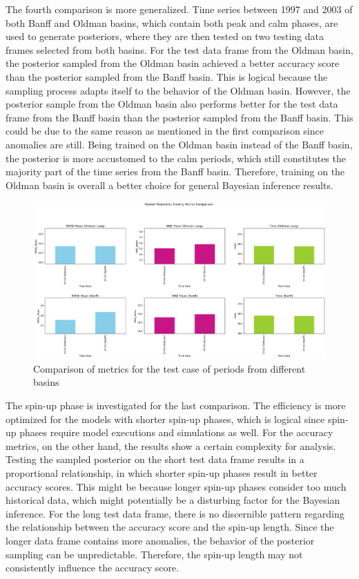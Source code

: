 The fourth comparison is more generalized. Time series between 1997 and 2003 of both Banff and Oldman basins, which contain both peak and calm phases, are used to generate posteriors, where they are then tested on two testing data frames selected from both basins. For the test data frame from the Oldman basin, the posterior sampled from the Oldman basin achieved a better accuracy score than the posterior sampled from the Banff basin. This is logical because the sampling process adapts itself to the behavior of the Oldman basin. However, the posterior sample from the Oldman basin also performs better for the test data frame from the Banff basin than the posterior sampled from the Banff basin. This could be due to the same reason as mentioned in the first comparison since anomalies are still. 
Being trained on the Oldman basin instead of the Banff basin, the posterior is more accustomed to the calm periods, which still constitutes the majority part of the time series from the Banff basin. Therefore, training on the Oldman basin is overall a better choice for general Bayesian inference results.
\begin{figure}[H]
    \centering
    \includegraphics[width=.8\textwidth]{figures/time_series_analysis/comparison/parallel_timestamp.png}
    \captionsetup{width=.8\textwidth}
    \caption{Comparison of metrics for the test case of periods from different basins}
    \label{fig:enter-label}
\end{figure}

The spin-up phase is investigated for the last comparison. The efficiency is more optimized for the models with shorter spin-up phases, which is logical since spin-up phases require model executions and simulations as well. For the accuracy metrics, on the other hand, the results show a certain complexity for analysis. Testing the sampled posterior on the short test data frame results in a proportional relationship, in which shorter spin-up phases result in better accuracy scores. This might be because longer spin-up phases consider too much historical data, which might potentially be a disturbing factor for the Bayesian inference. For the long test data frame, there is no discernible pattern regarding the relationship between the accuracy score and the spin-up length. Since the longer data frame contains more anomalies, the behavior of the posterior sampling can be unpredictable. Therefore, the spin-up length may not consistently influence the accuracy score.

